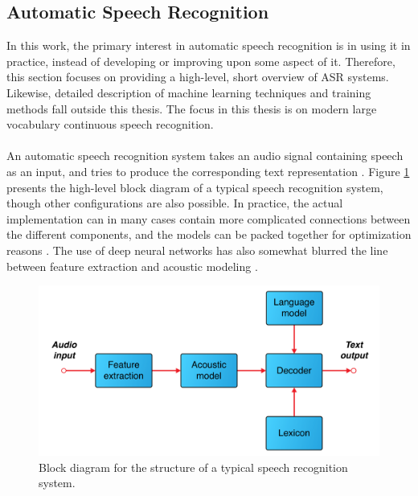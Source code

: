 \documentclass[english, 12pt, a4paper, pdftex, elec, utf8]{aaltothesis}
\begin{document}
\clearpage

\subsection{Automatic Speech Recognition} \label{subsec:asr}

In this work, the primary interest in automatic speech recognition is in using it in practice, instead of developing or improving upon some aspect of it. Therefore, this section focuses on providing a high-level, short overview of ASR systems. Likewise, detailed description of machine learning techniques and training methods fall outside this thesis. The focus in this thesis is on modern large vocabulary continuous speech recognition. \\\\ An automatic speech recognition system takes an audio signal containing speech as an input, and tries to produce the corresponding text representation \cite{huang2001spoken, li2014overview}. Figure \ref{fig:asr} presents the high-level block diagram of a typical speech recognition system, though other configurations are also possible. In practice, the actual implementation can in many cases contain more complicated connections between the different components, and the models can be packed together for optimization reasons \cite{yu2014automatic, kallasjoki2016}. The use of deep neural networks has also somewhat blurred the line between feature extraction and acoustic modeling \cite{hinton2012deep, kallasjoki2016}. \\
\begin{figure}[h]
	\centering 
	\includegraphics[trim={1.8cm 0cm 1.8cm 0cm}, clip, width=\textwidth]{ASR.pdf}
	\caption{Block diagram for the structure of a typical speech recognition system.}
	\label{fig:asr} 
\end{figure} \\
\end{document}

